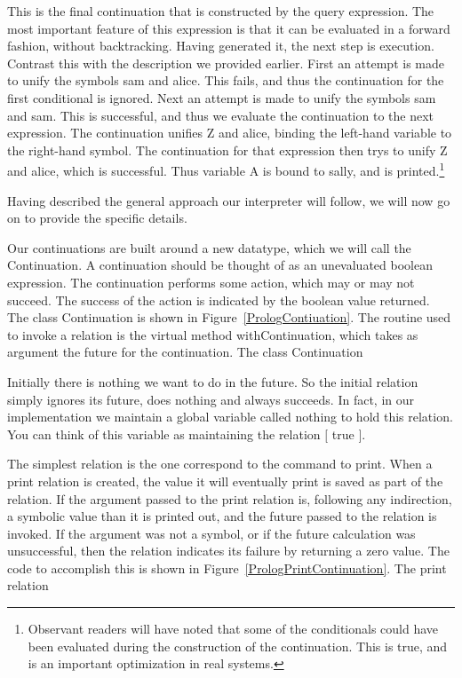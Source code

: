 This is the final continuation that is constructed by the query expression.  The
most important feature of this expression is that it can be evaluated in a
forward fashion, without backtracking.  Having generated it, the next step is
execution.  Contrast this with the description we provided earlier.  First an
attempt is made to unify the symbols {\sf sam} and {\sf alice}.  This fails, and
thus the continuation for the first conditional is ignored.  Next an attempt is
made to unify the symbols {\sf sam} and {\sf sam}.  This is successful, and thus
we evaluate the continuation to the next expression.  The continuation unifies
{\sf Z} and {\sf alice}, binding the left-hand variable to the right-hand
symbol.  The continuation for that expression then trys to unify {\sf Z} and
{\sf alice}, which is successful.  Thus variable {\sf A} is bound to {\sf
    sally}, and is printed.\footnote{Observant readers will have noted that some
    of the conditionals could have been evaluated during the construction of the
    continuation.  This is true, and is an important optimization in real
    systems.}

Having described the general approach our interpreter will follow, we will now
go on to provide the specific details.

Our continuations are built around a new datatype, which we will call the {\sf
    Continuation}.  A continuation should be thought of as an unevaluated
boolean expression.  The continuation performs some action, which may or may not
succeed.  The success of the action is indicated by the boolean value returned.
The class Continuation is shown in Figure~\ref{PrologContiuation}.  The routine
used to invoke a relation is the virtual method {\sf withContinuation}, which
takes as argument the future for the continuation.
%
{The class {\sf Continuation}}

Initially there is nothing we want to do in the future.  So the initial relation
simply ignores its future, does nothing and always succeeds.  In fact, in our
implementation we maintain a global variable called {\sf nothing} to hold this
relation.  You can think of this variable as maintaining the relation $[$ true
$]$.

The simplest relation is the one correspond to the command to print.  When a
print relation is created, the value it will eventually print is saved as part
of the relation.  If the argument passed to the print relation is, following any
indirection, a symbolic value than it is printed out, and the future passed to
the relation is invoked.  If the argument was not a symbol, or if the future
calculation was unsuccessful, then the relation indicates its failure by
returning a zero value.  The code to accomplish this is shown in
Figure~\ref{PrologPrintContinuation}.
%
{The print relation}


